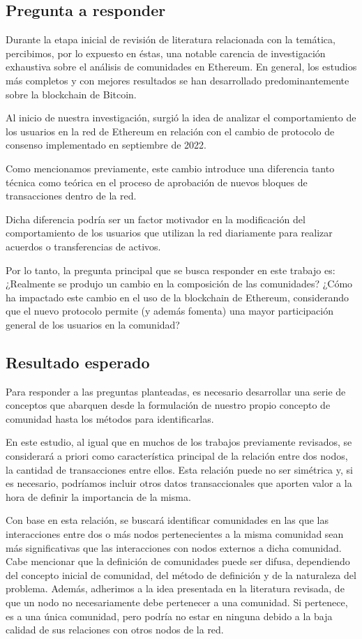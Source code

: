 \documentclass{article}
\begin{document}
\subsection{Pregunta a responder}
Durante la etapa inicial de revisión de literatura relacionada con la temática, percibimos, por lo expuesto en éstas, una notable carencia de investigación exhaustiva sobre el análisis de comunidades en Ethereum. En general, los estudios más completos y con mejores resultados se han desarrollado predominantemente sobre la blockchain de Bitcoin.

Al inicio de nuestra investigación, surgió la idea de analizar el comportamiento de los usuarios en la red de Ethereum en relación con el cambio de protocolo de consenso implementado en septiembre de 2022.

Como mencionamos previamente, este cambio introduce una diferencia tanto técnica como teórica en el proceso de aprobación de nuevos bloques de transacciones dentro de la red.

Dicha diferencia podría ser un factor motivador en la modificación del comportamiento de los usuarios que utilizan la red diariamente para realizar acuerdos o transferencias de activos.

Por lo tanto, la pregunta principal que se busca responder en este trabajo es: ¿Realmente se produjo un cambio en la composición de las comunidades? ¿Cómo ha impactado este cambio en el uso de la blockchain de Ethereum, considerando que el nuevo protocolo permite (y además fomenta) una mayor participación general de los usuarios en la comunidad?

\subsection{Resultado esperado}
Para responder a las preguntas planteadas, es necesario desarrollar una serie de conceptos que abarquen desde la formulación de nuestro propio concepto de comunidad hasta los métodos para identificarlas.

En este estudio, al igual que en muchos de los trabajos previamente revisados, se considerará a priori como característica principal de la relación entre dos nodos, la cantidad de transacciones entre ellos. Esta relación puede no ser simétrica y, si es necesario, podríamos incluir otros datos transaccionales que aporten valor a la hora de definir la importancia de la misma.

Con base en esta relación, se buscará identificar comunidades en las que las interacciones entre dos o más nodos pertenecientes a la misma comunidad sean más significativas que las interacciones con nodos externos a dicha comunidad.
Cabe mencionar que la definición de comunidades puede ser difusa, dependiendo del concepto inicial de comunidad, del método de definición y de la naturaleza del problema. Además, adherimos a la idea presentada en la literatura revisada, de que un nodo no necesariamente debe pertenecer a una comunidad. Si pertenece, es a una única comunidad, pero podría no estar en ninguna debido a la baja calidad de sus relaciones con otros nodos de la red.
\end{document}
